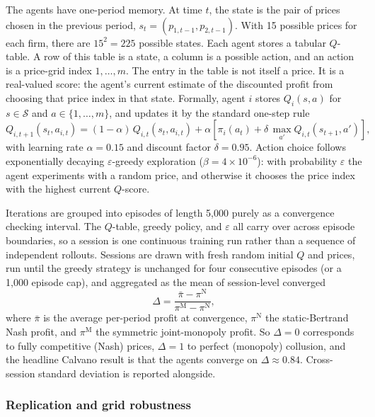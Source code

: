 The agents have one-period memory. At time $t$, the state is the pair of prices chosen in the previous period, $s_t=(p_{1,t-1},p_{2,t-1})$. With 15 possible prices for each firm, there are $15^2=225$ possible states. Each agent stores a tabular $Q$-table. A row of this table is a state, a column is a possible action, and an action is a price-grid index $1,\dots,m$. The entry in the table is not itself a price. It is a real-valued score: the agent's current estimate of the discounted profit from choosing that price index in that state. Formally, agent $i$ stores $Q_i(s,a)$ for $s\in\mathcal{S}$ and $a\in\{1,\dots,m\}$, and updates it by the standard one-step rule
\begin{equation}
    Q_{i,t+1}(s_t, a_{i,t}) = (1-\alpha)\,Q_{i,t}(s_t,a_{i,t}) + \alpha\!\left[\pi_i(a_t) + \delta\,\max_{a'}Q_{i,t}(s_{t+1}, a')\right],
    \label{eq:Q-update}
\end{equation}
with learning rate $\alpha=0.15$ and discount factor $\delta=0.95$. Action choice follows exponentially decaying $\varepsilon$-greedy exploration ($\beta=4\times 10^{-6}$): with probability $\varepsilon$ the agent experiments with a random price, and otherwise it chooses the price index with the highest current $Q$-score.

Iterations are grouped into episodes of length 5{,}000 purely as a convergence checking interval. The $Q$-table, greedy policy, and $\varepsilon$ all carry over across episode boundaries, so a session is one continuous training run rather than a sequence of independent rollouts. Sessions are drawn with fresh random initial $Q$ and prices, run until the greedy strategy is unchanged for four consecutive episodes (or a 1{,}000 episode cap), and aggregated as the mean of session-level converged
\[
    \Delta = \frac{\bar\pi-\pi^{\mathrm{N}}}{\pi^{\mathrm{M}}-\pi^{\mathrm{N}}},
\]
where $\bar\pi$ is the average per-period profit at convergence, $\pi^{\mathrm{N}}$ the static-Bertrand Nash profit, and $\pi^{\mathrm{M}}$ the symmetric joint-monopoly profit. So $\Delta=0$ corresponds to fully competitive (Nash) prices, $\Delta=1$ to perfect (monopoly) collusion, and the headline Calvano result is that the agents converge on $\Delta\approx 0.84$. Cross-session standard deviation is reported alongside.

\subsubsection*{Replication and grid robustness}

